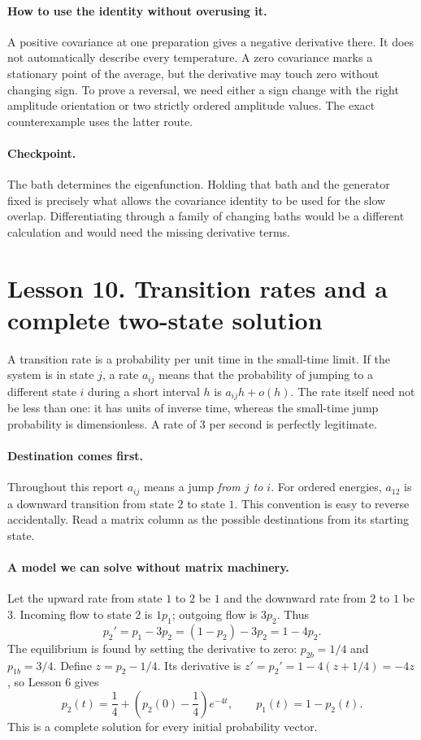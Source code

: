 \paragraph{How to use the identity without overusing it.}
A positive covariance at one preparation gives a negative derivative there.
It does not automatically describe every temperature. A zero covariance marks
a stationary point of the average, but the derivative may touch zero without
changing sign. To prove a reversal, we need either a sign change with the
right amplitude orientation or two strictly ordered amplitude values.
The exact counterexample uses the latter route.

\paragraph{Checkpoint.}
The bath determines the eigenfunction. Holding that bath and the generator
fixed is precisely what allows the covariance identity to be used for the
slow overlap. Differentiating through a family of changing baths would be a
different calculation and would need the missing derivative terms.

\clearpage
\section*{Lesson 10. Transition rates and a complete two-state solution}
A transition rate is a probability per unit time in the small-time limit.
If the system is in state $j$, a rate $a_{ij}$ means that the probability of
jumping to a different state $i$ during a short interval $h$ is
$a_{ij}h+o(h)$. The rate itself need not be less than one: it has units of
inverse time, whereas the small-time jump probability is dimensionless.
A rate of $3$ per second is perfectly legitimate.

\paragraph{Destination comes first.}
Throughout this report $a_{ij}$ means a jump \emph{from $j$ to $i$}.
For ordered energies, $a_{12}$ is a downward transition from state $2$ to
state $1$. This convention is easy to reverse accidentally. Read a matrix
column as the possible destinations from its starting state.

\paragraph{A model we can solve without matrix machinery.}
Let the upward rate from state $1$ to $2$ be $1$ and the downward rate from
$2$ to $1$ be $3$. Incoming flow to state $2$ is $1p_1$; outgoing flow is
$3p_2$. Thus
\[
p_2'=p_1-3p_2=(1-p_2)-3p_2=1-4p_2.
\]
The equilibrium is found by setting the derivative to zero:
$p_{2b}=1/4$ and $p_{1b}=3/4$. Define $z=p_2-1/4$. Its derivative is
$z'=p_2'=1-4(z+1/4)=-4z$, so Lesson 6 gives
\[
p_2(t)=\frac14+\left(p_2(0)-\frac14\right)e^{-4t},
\qquad p_1(t)=1-p_2(t).
\]
This is a complete solution for every initial probability vector.

